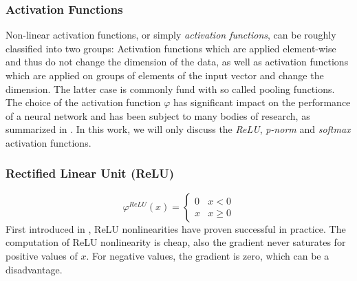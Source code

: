 \subsubsection{Activation Functions}

Non-linear activation functions, or simply \textit{activation functions}, can be roughly classified into two groups: Activation functions which are applied element-wise and thus do not change the dimension of the data, as well as activation functions which are applied on groups of elements of the input vector and change the dimension. The latter case is commonly fund with so called pooling functions. The choice of the activation function $\varphi$ has significant impact on the performance of a neural network and has been subject to many bodies of research, as summarized in \cite{thoma2017analysis}. In this work, we will only discuss the \textit{ReLU}, \textit{p-norm} and \textit{softmax} activation functions. 

\subsubsection*{Rectified Linear Unit (ReLU)}
\begin{minipage}{0.45\textwidth}
	\[\varphi^{ReLU}(x) = \begin{cases}
	0 & x < 0 \\
	x & x \geq 0
	\end{cases}\]
	First introduced in \cite{krizhevsky2012imagenet}, ReLU nonlinearities have proven successful in practice. The computation of ReLU nonlinearity is cheap, also the gradient never saturates for positive values of $x$. For negative values, the gradient is zero, which can be a disadvantage.  
\end{minipage}
\hfill
\begin{minipage}{0.45\textwidth}
\end{minipage}

